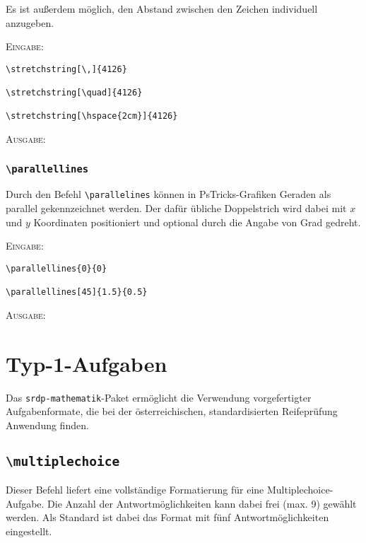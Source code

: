 \documentclass[a4paper,12pt]{article}
\begin{document}
Es ist außerdem möglich, den Abstand zwischen den Zeichen individuell anzugeben.\leer

\textsc{Eingabe:}
\begin{verbatim}
\stretchstring[\,]{4126}

\stretchstring[\quad]{4126}

\stretchstring[\hspace{2cm}]{4126}
\end{verbatim}

\textsc{Ausgabe:}\\




\subsubsection{\texttt{\textbackslash parallellines}}
Durch den Befehl \texttt{\textbackslash parallelines} können in PsTricks-Grafiken Geraden als parallel gekennzeichnet werden. Der dafür übliche Doppelstrich wird dabei mit $x$ und $y$ Koordinaten positioniert und optional durch die Angabe von Grad gedreht.

\textsc{Eingabe:}
\begin{verbatim}
\parallellines{0}{0}

\parallellines[45]{1.5}{0.5}
\end{verbatim} 

\textsc{Ausgabe:}



\section{Typ-1-Aufgaben}

Das \texttt{srdp-mathematik}-Paket ermöglicht die Verwendung vorgefertigter Aufgabenformate, die bei der österreichischen, standardisierten Reifeprüfung Anwendung finden.


\subsection{\texttt{\textbackslash multiplechoice}}

Dieser Befehl liefert eine vollständige Formatierung für eine Multiplechoice-Aufgabe. Die Anzahl der Antwortmöglichkeiten kann dabei frei (max. 9) gewählt werden. Als Standard ist dabei das Format mit fünf Antwortmöglichkeiten eingestellt. \leer
\end{document}
